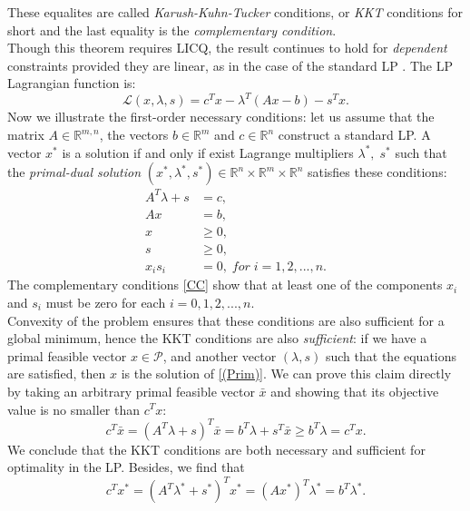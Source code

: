 \documentclass[a4paper,10 pt,titlepage,twoside]{book}
\theoremstyle{plain}
\theoremstyle{definition}
\theoremstyle{remark}
\begin{document}
These equalites are called \textit{Karush-Kuhn-Tucker} conditions, or \textit{KKT} conditions for short and the last equality is the \textit{complementary condition}.\\ Though this theorem requires LICQ, the result continues to hold for \textit{dependent} constraints provided they are linear, as in the case of the standard LP \cite{W}. The LP Lagrangian function is:\\
\begin{equation}\label{Lagrangian}
\mathcal{L}(x,\lambda,s)=c^{T}x-\lambda^{T}\left(Ax-b\right)-s^{T}x.
\end{equation}
Now we illustrate the first-order necessary conditions: let us assume that the matrix $A\in\mathbb{R}^{m,n}$, the vectors $b\in\mathbb{R}^{m}$ and $c\in\mathbb{R}^{n}$ construct a standard LP. A vector $x^{*}$ is a solution if and only if exist Lagrange multipliers $\lambda^{*},\;s^{*}$ such that the \textit{primal-dual solution} $\left( x^{*},\lambda^{*},s^{*}\right)\in\mathbb{R}^{n}\times\mathbb{R}^{m}\times\mathbb{R}^{n}$ satisfies these conditions: 
\begin{align}
A^{T}\lambda+s&=c,\tag{2.5a}\\ \label{DF}
Ax&=b,\tag{2.5b}\\ \label{PF}
x&\geq 0,\tag{2.5c}\\
s&\geq 0,\tag{2.5d}\\
x_{i}s_{i}&=0,\; for\;i= 1,2,...,n.\label{CC} \tag{2.5e}
\end{align} 
The complementary conditions \ref{CC} show that at least one of the components $x_{i}$ and $s_{i}$ must be zero for each $i=0,1,2,...,n$.\\
 Convexity of the problem ensures that these conditions are also sufficient for a global minimum, hence the KKT conditions are also \textit{sufficient}: if we have a primal feasible vector $x\in\mathcal{P}$, and another vector $(\lambda, s)$ such that the equations are satisfied, then $x$ is the solution of \ref{(Prim)}. We can prove this claim directly by taking an arbitrary primal feasible vector $\bar{x}$ and showing that its objective value is no smaller than $c^{T}x$:
\begin{equation*}
c^{T}\bar{x}=(A^{T}\lambda+s)^{T}\bar{x}=b^{T}\lambda+s^{T}\bar{x}\geq b^{T}\lambda= c^{T}x.
\end{equation*}
We conclude that the KKT conditions are both necessary and sufficient for optimality in the LP. Besides, we find that
\begin{equation*}
	c^{T}x^{*}=\left(A^{T}\lambda^{*}+s^{*}\right)^{T}x^{*}=\left(Ax^{*}\right)^{T}\lambda^{*}=b^{T}\lambda^{*}.
\end{equation*}
\end{document}
